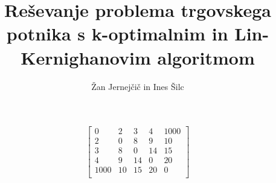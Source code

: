 \documentclass[8pt]{beamer}
\begin{document}
\title[Reševanje TSP s k-opt in LK algoritmom]{Reševanje problema trgovskega potnika s k-optimalnim in
Lin-Kernighanovim algoritmom}
\author[Žan Jernejčič in Ines Šilc]{Žan Jernejčič in Ines Šilc}

\begin{frame}
	\titlepage
\end {frame}

%
%
%

\begin{frame}
\begin{equation}
\label{matrika}
\begin{bmatrix} 
0&2&3&4&1000\\
2&0&8&9&10\\
3&8&0&14&15\\
4&9&14&0&20\\
1000&10&15&20&0\\
\end{bmatrix}
\end{equation}
\end{frame}
\end{document}
